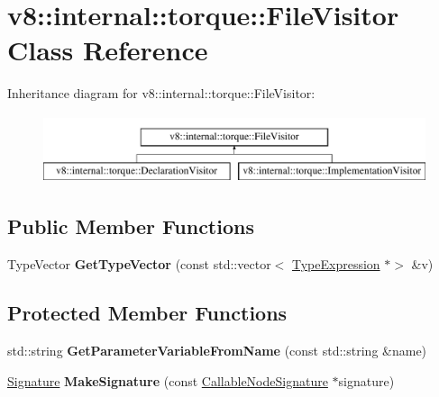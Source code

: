 \hypertarget{classv8_1_1internal_1_1torque_1_1FileVisitor}{}\section{v8\+:\+:internal\+:\+:torque\+:\+:File\+Visitor Class Reference}
\label{classv8_1_1internal_1_1torque_1_1FileVisitor}
Inheritance diagram for v8\+:\+:internal\+:\+:torque\+:\+:File\+Visitor\+:\begin{figure}[H]
\begin{center}
\leavevmode
\includegraphics[height=2.000000cm]{classv8_1_1internal_1_1torque_1_1FileVisitor}
\end{center}
\end{figure}
\subsection*{Public Member Functions}
\begin{DoxyCompactItemize}
\item 
\mbox{\label{classv8_1_1internal_1_1torque_1_1FileVisitor_ad9e8d5148b1bb59062ba2eba5b8fa560}} 
Type\+Vector {\bfseries Get\+Type\+Vector} (const std\+::vector$<$ \mbox{\hyperlink{structv8_1_1internal_1_1torque_1_1TypeExpression}{Type\+Expression}} $\ast$$>$ \&v)
\end{DoxyCompactItemize}
\subsection*{Protected Member Functions}
\begin{DoxyCompactItemize}
\item 
\mbox{\label{classv8_1_1internal_1_1torque_1_1FileVisitor_ade8fd74d39b3a1e7647723c991aef851}} 
std\+::string {\bfseries Get\+Parameter\+Variable\+From\+Name} (const std\+::string \&name)
\item 
\mbox{\label{classv8_1_1internal_1_1torque_1_1FileVisitor_a2473f984d09d4602adb5f8012d5f4d23}} 
\mbox{\hyperlink{structv8_1_1internal_1_1torque_1_1Signature}{Signature}} {\bfseries Make\+Signature} (const \mbox{\hyperlink{structv8_1_1internal_1_1torque_1_1CallableNodeSignature}{Callable\+Node\+Signature}} $\ast$signature)
\end{DoxyCompactItemize}


